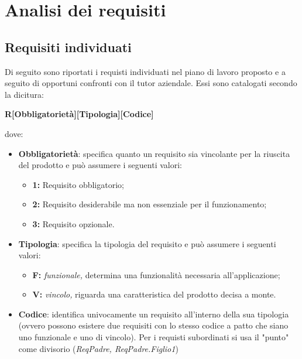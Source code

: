
\chapter{Analisi dei requisiti}
\label{cap:analisi-requisiti}

\section{Requisiti individuati}

Di seguito sono riportati i requisti individuati nel piano di lavoro proposto e a seguito di opportuni confronti con il tutor aziendale. Essi sono catalogati secondo la dicitura:
\begin{center}
    \textbf{R[Obbligatorietà][Tipologia][Codice]}
\end{center}
dove:
\begin{itemize}
    \item \textbf{Obbligatorietà}: specifica quanto un requisito sia vincolante per la riuscita del prodotto e può assumere i seguenti valori:
    \begin{itemize}
        \item \textbf{1: } Requisito obbligatorio;
        \item \textbf{2: } Requisito desiderabile ma non essenziale per il funzionamento;
        \item \textbf{3: } Requisito opzionale.
    \end{itemize}
    \item \textbf{Tipologia}: specifica la tipologia del requisito e può assumere i seguenti valori:
    \begin{itemize}
        \item \textbf{F: }\textit{funzionale,} determina una funzionalità necessaria all'applicazione;
        \item \textbf{V: }\textit{vincolo,} riguarda una caratteristica del prodotto decisa a monte.
    \end{itemize}
    \item \textbf{Codice}: identifica univocamente un requisito all'interno della sua tipologia (ovvero possono esistere due requisiti con lo stesso codice a patto che siano uno funzionale e uno di vincolo). Per i requisti subordinati si usa il "punto" come divisorio (\textit{ReqPadre, ReqPadre.Figlio1})
\end{itemize}

